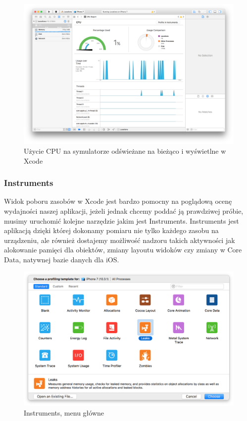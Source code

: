\begin{figure}[ht!]
  \centering
  \includegraphics[width=120mm]{images/chapter-2-image-5-debugger.png}
  \caption{Użycie CPU na symulatorze odświeżane na bieżąco i wyświetlne w Xcode}
  \label{chapter-2-image-5-debugger}
\end{figure}

\subsubsection*{Instruments}

Widok poboru zasobów w Xcode jest bardzo pomocny na poglądową ocenę wydajności naszej aplikacji, jeżeli jednak chcemy poddać ją
prawdziwej próbie, musimy uruchomić kolejne narzędzie jakim jest Instruments. Instruments jest aplikacją dzięki której dokonamy
pomiaru nie tylko każdego zasobu na urządzeniu, ale również dostajemy możliwość nadzoru takich aktywności jak alokowanie pamięci
dla obiektów, zmiany layoutu widoków czy zmiany w Core Data, natywnej bazie danych dla iOS.

\begin{figure}[ht!]
  \centering
  \includegraphics[width=120mm]{images/chapter-2-image-6-instruments.png}
  \caption{Instruments, menu główne}
  \label{chapter-2-image-6-instruments}
\end{figure}

